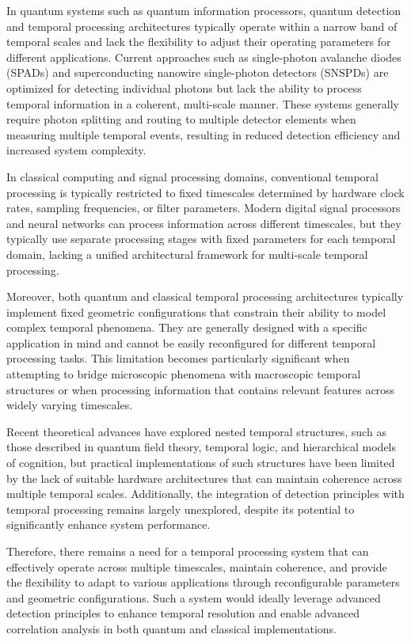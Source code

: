 \documentclass[12pt,letterpaper]{article}
\begin{document}
In quantum systems such as quantum information processors, quantum detection and temporal processing architectures typically operate within a narrow band of temporal scales and lack the flexibility to adjust their operating parameters for different applications. Current approaches such as single-photon avalanche diodes (SPADs) and superconducting nanowire single-photon detectors (SNSPDs) are optimized for detecting individual photons but lack the ability to process temporal information in a coherent, multi-scale manner. These systems generally require photon splitting and routing to multiple detector elements when measuring multiple temporal events, resulting in reduced detection efficiency and increased system complexity.

In classical computing and signal processing domains, conventional temporal processing is typically restricted to fixed timescales determined by hardware clock rates, sampling frequencies, or filter parameters. Modern digital signal processors and neural networks can process information across different timescales, but they typically use separate processing stages with fixed parameters for each temporal domain, lacking a unified architectural framework for multi-scale temporal processing.

Moreover, both quantum and classical temporal processing architectures typically implement fixed geometric configurations that constrain their ability to model complex temporal phenomena. They are generally designed with a specific application in mind and cannot be easily reconfigured for different temporal processing tasks. This limitation becomes particularly significant when attempting to bridge microscopic phenomena with macroscopic temporal structures or when processing information that contains relevant features across widely varying timescales.

Recent theoretical advances have explored nested temporal structures, such as those described in quantum field theory, temporal logic, and hierarchical models of cognition, but practical implementations of such structures have been limited by the lack of suitable hardware architectures that can maintain coherence across multiple temporal scales. Additionally, the integration of detection principles with temporal processing remains largely unexplored, despite its potential to significantly enhance system performance.

Therefore, there remains a need for a temporal processing system that can effectively operate across multiple timescales, maintain coherence, and provide the flexibility to adapt to various applications through reconfigurable parameters and geometric configurations. Such a system would ideally leverage advanced detection principles to enhance temporal resolution and enable advanced correlation analysis in both quantum and classical implementations.
\end{document}

